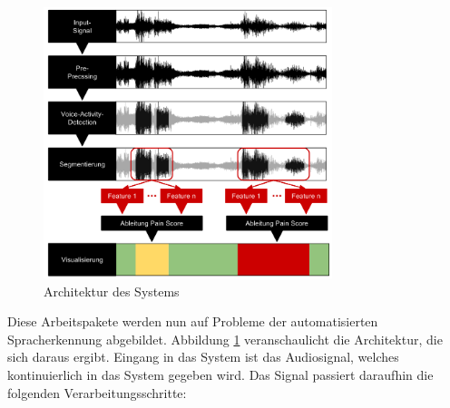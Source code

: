 \begin{figure}[H]
	\centering
	\includegraphics[width=0.75\textwidth]{bilder/architektur.png}
	\caption{Architektur des Systems}
	\label{img:architecture-overview}
\end{figure}

Diese Arbeitspakete werden nun auf Probleme der automatisierten Spracherkennung abgebildet. Abbildung \ref{img:architecture-overview} veranschaulicht die Architektur, die sich daraus ergibt. Eingang in das System ist das Audiosignal, welches kontinuierlich in das System gegeben wird. Das Signal passiert daraufhin die folgenden Verarbeitungsschritte:

